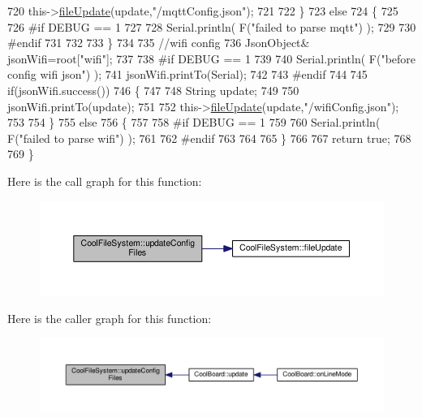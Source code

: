 \begin{DoxyCode}
720         this->\hyperlink{class_cool_file_system_a13f2958f5b87757c31fc53797a30d23a}{fileUpdate}(update,\textcolor{stringliteral}{"/mqttConfig.json"});      
721 
722     \}
723     \textcolor{keywordflow}{else}
724     \{
725 
726 \textcolor{preprocessor}{    #if DEBUG == 1 }
727 
728         Serial.println( F(\textcolor{stringliteral}{"failed to parse mqtt"}) );
729     
730 \textcolor{preprocessor}{    #endif}
731 
732     
733     \}   
734 
735     \textcolor{comment}{//wifi config}
736         JsonObject& jsonWifi=root[\textcolor{stringliteral}{"wifi"}];
737     
738 \textcolor{preprocessor}{#if DEBUG == 1 }
739 
740     Serial.println( F(\textcolor{stringliteral}{"before config wifi json"}) );
741     jsonWifi.printTo(Serial);
742 
743 \textcolor{preprocessor}{#endif}
744 
745     \textcolor{keywordflow}{if}(jsonWifi.success())
746     \{
747 
748         String update;
749     
750         jsonWifi.printTo(update);
751 
752         this->\hyperlink{class_cool_file_system_a13f2958f5b87757c31fc53797a30d23a}{fileUpdate}(update,\textcolor{stringliteral}{"/wifiConfig.json"});      
753 
754     \}
755     \textcolor{keywordflow}{else}
756     \{
757 
758 \textcolor{preprocessor}{    #if DEBUG == 1 }
759 
760         Serial.println( F(\textcolor{stringliteral}{"failed to parse wifi"}) );
761     
762 \textcolor{preprocessor}{    #endif}
763 
764     
765     \}   
766         
767     \textcolor{keywordflow}{return} \textcolor{keyword}{true};
768 
769 \}   
\end{DoxyCode}
Here is the call graph for this function\+:\nopagebreak
\begin{figure}[H]
\begin{center}
\leavevmode
\includegraphics[width=350pt]{db/d0c/class_cool_file_system_adfa8e2e80641ae6f0cceabd348a9b841_cgraph}
\end{center}
\end{figure}
Here is the caller graph for this function\+:\nopagebreak
\begin{figure}[H]
\begin{center}
\leavevmode
\includegraphics[width=350pt]{db/d0c/class_cool_file_system_adfa8e2e80641ae6f0cceabd348a9b841_icgraph}
\end{center}
\end{figure}



